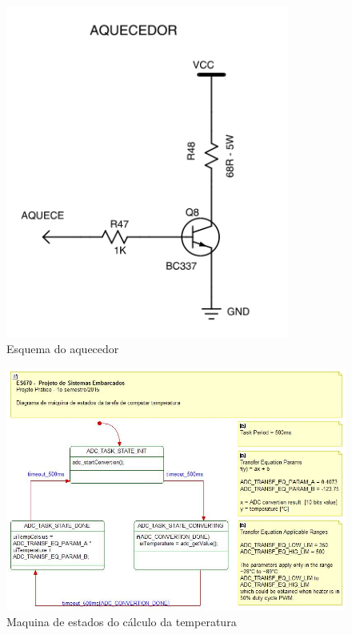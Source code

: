 \documentclass{article}
\begin{document}
\begin{figure}[H]
	\centering
	\includegraphics[width=0.9\linewidth]{esq_aquecedor}
	\caption{Esquema do aquecedor}
	\label{fig:esq_aquecedor}
\end{figure}
\begin{figure}[H]
	\centering
	\includegraphics[width=0.9\linewidth]{maq_temperatura}
	\caption{Maquina de estados do cálculo da temperatura}
	\label{fig:maq_temperatura}
\end{figure}
\end{document}
